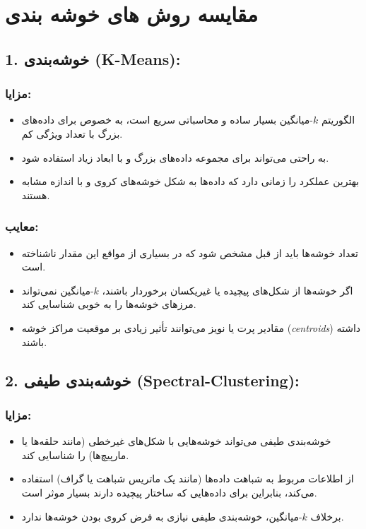 \documentclass[a4paper,12pt,openany]{report}
\begin{document}
\chapter{مقایسه روش های خوشه بندی}

\section*{1. خوشه‌بندی (K-Means):}

\subsection*{مزایا:}
\begin{itemize}
	\item  الگوریتم \( k \)-میانگین بسیار ساده و محاسباتی سریع است، به خصوص برای داده‌های بزرگ با تعداد ویژگی کم.
	\item به راحتی می‌تواند برای مجموعه داده‌های بزرگ و با ابعاد زیاد استفاده شود.
	\item  بهترین عملکرد را زمانی دارد که داده‌ها به شکل خوشه‌های کروی و با اندازه مشابه هستند.
\end{itemize}

\subsection*{معایب:}
\begin{itemize}
	\item  تعداد خوشه‌ها باید از قبل مشخص شود که در بسیاری از مواقع این مقدار ناشناخته است.
	\item  اگر خوشه‌ها از شکل‌های پیچیده یا غیریکسان برخوردار باشند، \( k \)-میانگین نمی‌تواند مرزهای خوشه‌ها را به خوبی شناسایی کند.
	\item  مقادیر پرت یا نویز می‌توانند تأثیر زیادی بر موقعیت مراکز خوشه (\textit{centroids}) داشته باشند.
\end{itemize}

\section*{2. خوشه‌بندی طیفی (Spectral-Clustering):}

\subsection*{مزایا:}
\begin{itemize}
	\item  خوشه‌بندی طیفی می‌تواند خوشه‌هایی با شکل‌های غیرخطی (مانند حلقه‌ها یا مارپیچ‌ها) را شناسایی کند.
	\item از اطلاعات مربوط به شباهت داده‌ها (مانند یک ماتریس شباهت یا گراف) استفاده می‌کند، بنابراین برای داده‌هایی که ساختار پیچیده دارند بسیار موثر است.
	\item  برخلاف \( k \)-میانگین، خوشه‌بندی طیفی نیازی به فرض کروی بودن خوشه‌ها ندارد.
\end{itemize}
\end{document}
